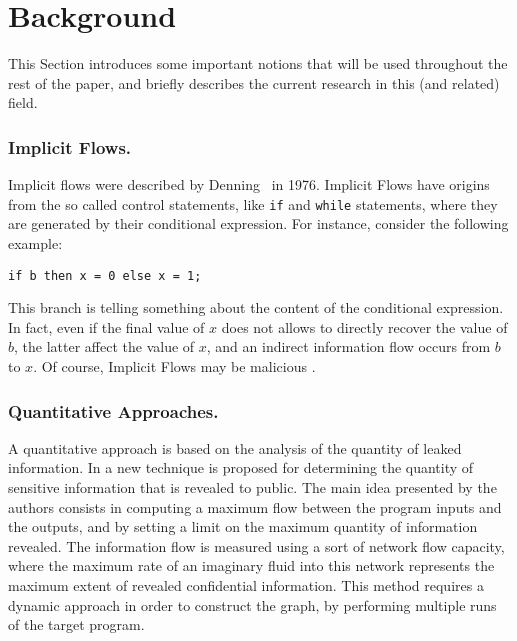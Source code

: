 \documentclass{llncs}
\begin{document}
\section{Background}

This Section introduces some important notions that will be used throughout the rest of the paper, and briefly describes the current research in this (and related) field.

\subsubsection{Implicit Flows.}
Implicit flows were described by Denning~\cite{DD76} in 1976. Implicit Flows have origins from the so called control statements, like \texttt{if} and \texttt{while} statements, where they are generated by their conditional expression. For instance, consider the following example:
\begin{lstlisting}[numbers=none]
if b then x = 0 else x = 1;
\end{lstlisting}
This branch is telling something about the content of the conditional expression. In fact, even if the final value of  $x$ does not allows to directly recover the value of $b$, the latter affect the value of $x$, and an indirect information flow occurs from $b$ to $x$. Of course, Implicit Flows may be  malicious \cite{Russo09implicitflows}. 

\subsubsection{Quantitative Approaches.}
A quantitative approach is based on the analysis of the quantity of leaked information. In \cite{McCamant08} a new technique is proposed for determining the quantity of sensitive information that is revealed to public. The main idea presented by the authors consists in computing a maximum flow between the program inputs and the outputs, and by setting a limit on the maximum quantity of information revealed. The information flow is  measured using a sort of network flow capacity, where the maximum rate of an imaginary fluid into this network represents the maximum extent of revealed confidential information. This method requires a dynamic approach in order to construct the graph, by  performing multiple runs of the target program. 
\end{document}
